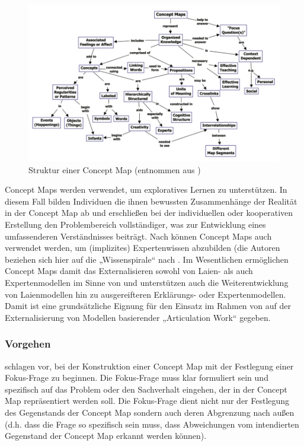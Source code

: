 \begin{figure}[htbp]
	\centering
		\includegraphics[width=12cm]{img/MentaleModelle/novak_concept_maps.png}
	\caption[Struktur einer Concept Map]{Struktur einer Concept Map (entnommen aus \citep[][S. 2]{Novak06})}
	\label{fig:img_MentaleModelle_novak_concept_maps}
\end{figure}

Concept Maps werden verwendet, um exploratives Lernen zu unterstützen. In diesem Fall bilden Individuen die ihnen bewussten Zusammenhänge der Realität in der Concept Map ab und erschließen bei der individuellen oder kooperativen Erstellung den Problembereich vollständiger, was zur Entwicklung eines umfassenderen Verständnisses beiträgt. Nach \citet{Novak06} können Concept Maps auch verwendet werden, um (implizites) Expertenwissen abzubilden (die Autoren beziehen sich hier auf die „Wissenspirale“ nach \citet{Nonaka95}. Im Wesentlichen ermöglichen Concept Maps damit das Externalisieren sowohl von Laien- als auch Expertenmodellen im Sinne von \citet{Seel91} und unterstützen auch die Weiterentwicklung von Laienmodellen hin zu ausgereifteren Erklärungs- oder Expertenmodellen.  Damit ist eine grundsätzliche Eignung für den Einsatz im Rahmen von auf der Externalisierung von Modellen basierender „Articulation Work“ gegeben.

\subsubsection{Vorgehen}

\citet{Novak06} schlagen vor, bei der Konstruktion einer Concept Map mit der Festlegung einer Fokus-Frage zu beginnen. Die Fokus-Frage muss klar formuliert sein und spezifisch auf das Problem oder den Sachverhalt eingehen, der in der Concept Map repräsentiert werden soll. Die Fokus-Frage dient nicht nur der Festlegung des Gegenstands der Concept Map sondern auch deren Abgrenzung nach außen (d.h. dass die Frage so spezifisch sein muss, dass Abweichungen vom intendierten Gegenstand der Concept Map erkannt werden können).

